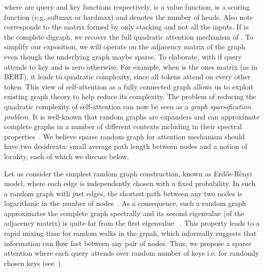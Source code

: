 \documentclass{article}
\begin{document}
where  are query and key functions respectively,  is a value function,  is a scoring function (e.g. softmax or hardmax) and  denotes the number of heads. 
Also note  corresponds to the matrix formed by only stacking  and not all the inputs. 
If  is the complete digraph, we recover the full quadratic attention mechanism of \citet{vaswani2017attention}. 
To simplify our exposition, we will operate on the adjacency matrix  of the graph   even though the underlying graph maybe sparse.
To elaborate,  with  if query  attends to key  and is zero otherwise.
For example, when  is the ones matrix (as in BERT), it leads to quadratic complexity, since all tokens attend on every other token.
This view of self-attention as a fully connected graph allows us to exploit existing graph theory to help reduce its complexity. 
The problem of reducing the quadratic complexity of self-attention can now be seen as a \emph{graph sparsification problem}. 
It is well-known that random graphs are expanders and can approximate complete graphs in a number of different contexts including in their spectral properties~\citep{spielman2011spectral,hoory2006expander}.
We believe sparse random graph for attention mechanism should have two desiderata: small average path length between nodes and a notion of locality, each of which we discuss below.

Let us consider the simplest random graph construction, known as  Erd\H{o}s-R\'enyi model, where each edge is independently chosen with a fixed probability.
In such a random graph with just  edges, the shortest path between any two nodes is logarithmic in the number of nodes~\citep{chung2002average, katzav2018distribution}.
As a consequence, such a random graph approximates the complete graph spectrally and its second eigenvalue (of the adjacency matrix) is quite far from the first eigenvalue ~\citep{benaych2019largest,benaych2020spectral,alt2019extremal}. 
This property leads to a rapid mixing time for random walks in the grpah, which informally suggests that information can flow fast between any pair of nodes.
Thus, we propose a sparse attention where each query attends over  random number of keys i.e.  for  randomly chosen keys (see~).
\end{document}
